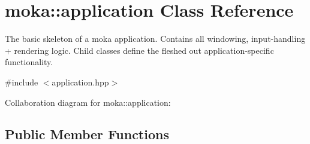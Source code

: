\hypertarget{classmoka_1_1application}{}\section{moka\+::application Class Reference}
\label{classmoka_1_1application}


The basic skeleton of a moka application. Contains all windowing, input-\/handling + rendering logic. Child classes define the fleshed out application-\/specific functionality.  




{\ttfamily \#include $<$application.\+hpp$>$}



Collaboration diagram for moka\+::application\+:
\subsection*{Public Member Functions}
